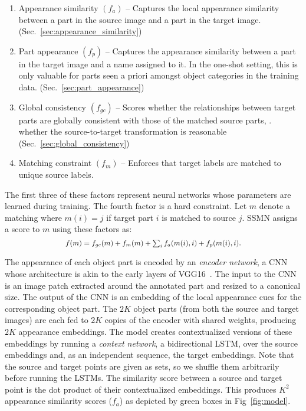 \documentclass[10pt,twocolumn,letterpaper]{article}
\begin{document}
\begin{enumerate}
\item Appearance similarity $(f_a)$ -- Captures the local appearance similarity between a part in the source image and a part in the target image. (Sec.~\ref{sec:appearance_similarity})
\item Part appearance $(f_p)$ -- Captures the appearance similarity between a part in the target image and a name assigned to it. In the one-shot setting, this is only valuable for parts seen a priori amongst object categories in the training data. (Sec.~\ref{sec:part_appearance})
\item Global consistency $(f_{gc})$ -- Scores whether the relationships between target parts are globally consistent with those of the matched source parts, \ie. whether the source-to-target transformation is reasonable (Sec.~\ref{sec:global_consistency})
\item Matching constraint $(f_m)$ -- Enforces that target labels are matched to unique source labels.
\end{enumerate}
The first three of these factors represent neural networks whose parameters are learned during training. The fourth factor is a hard constraint. Let $m$ denote a matching where $m(i) = j$ if target part $i$ is matched to source $j$. SSMN assigns a score to $m$ using these factors as:
\begin{equation}
\resizebox{7.5cm}{!}{$
    f(m) = f_{gc}(m) + f_m(m) + \sum_i f_a(m(i), i) + f_p(m(i), i).
$}
\label{eq:ssmn_model}
\end{equation}%

The appearance of each object part is encoded by an \emph{encoder network}, a CNN whose architecture is akin to the early layers of VGG16~\cite{simonyanZ14}. The input to the CNN is an image patch extracted around the annotated part and resized to a canonical size. The output of the CNN is an embedding of the local appearance cues for the corresponding object part. The $2K$ object parts (from both the source and target images) are each fed to $2K$ copies of the encoder with shared weights, producing $2K$ appearance embeddings. The model creates contextualized versions of these embeddings by running a \emph{context network}, a bidirectional LSTM, over the source embeddings and, as an independent sequence, the target embeddings. Note that the source and target points are given as sets, so we shuffle them arbitrarily before running the LSTMs. The similarity score between a source and target point is the dot product of their contextualized embeddings. This produces $K^2$ appearance similarity scores ($f_a$) as depicted by green boxes in Fig~\ref{fig:model}.
\end{document}

